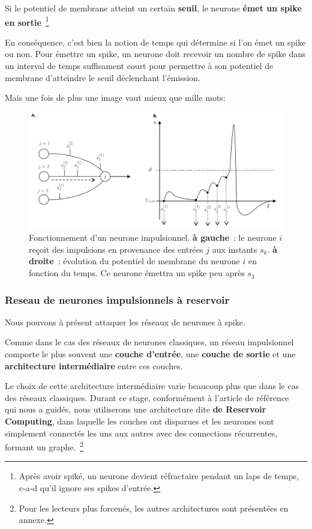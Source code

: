 Si le potentiel de membrane atteint un certain \textbf{seuil}, le neurone \textbf{émet un spike en sortie}~\footnote{Après avoir spiké, un neurone devient réfractaire pendant un laps de temps, c-a-d qu'il ignore ses spikes d'entrée.}

En conséquence, c'est bien la notion de temps qui détermine si l'on émet un spike ou non. Pour émettre un spike, un neurone doit recevoir un nombre de spike dans un interval de temps suffisament court  pour permettre à son potentiel de membrane d'atteindre le seuil déclenchant l'émission.

Mais une fois de plus une image vaut mieux que mille mots:\newline

\begin{figure}[h]
  \begin{center}
\includegraphics[width=12cm]{./images/image9.png}
\end{center}
\caption{Fonctionnement d'un neurone impulsionnel. \textbf{à gauche}~: le neurone $i$ reçoit des impulsions en provenance des entrées $j$ aux instants $s_k$. \textbf{à droite}~: évolution du potentiel de membrane du neurone $i$ en fonction du temps. Ce neurone émettra un spike peu après $s_3$}
\label{NeuroneASpike}
\end{figure}

\subsubsection{Reseau de neurones impulsionnels à reservoir}

Nous pouvons à présent attaquer les réseaux de neurones à spike.

Comme dans le cas des réseaux de neurones classiques, un réseau impulsionnel comporte le plus souvent une \textbf{couche d'entrée}, une \textbf{couche de sortie} et une \textbf{architecture intermédiaire} entre ces couches.

Le choix de cette architecture intermédiaire varie beaucoup plus que dans le cas des réseaux classiques. Durant ce stage, conformément à l'article de référence~\cite{Lympero} qui nous a guidés, nous utiliserons une architecture dite \textbf{de Reservoir Computing}, dans laquelle les couches ont disparues et les neurones sont simplement connectés les uns aux autres avec des connections récurrentes, formant un graphe.~\footnote{Pour les lecteurs plus forcenés, les autres architectures sont présentées en annexe.}

